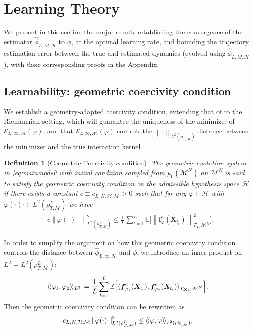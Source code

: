 \documentclass[11pt]{article}
\newtheorem{definition}{Definition}[section]
\newcommand{\mbf}[1]{\boldsymbol{#1}}
\newcommand{\inprod}[1]{\langle #1 \rangle}
\newcommand{\dbinprod}[1]{\langle\hspace{-0.5mm}\langle{#1}\rangle\hspace{-0.5mm}\rangle}
\newcommand{\norm}[1]{\left\| #1 \right\|}
\newcommand{\bX}{\mbf{X}}
\newcommand{\mE}{\mathcal{E}}
\newcommand{\mH}{\mathcal{H}}
\newcommand{\mM}{\mathcal{M}}
\newcommand{\intkernel}{\phi}
\newcommand{\lintkernel}{\widehat{\intkernel}}
\newcommand{\intkernelvar}{\varphi}
\newcommand{\E}{\mathbb{E}}
\newcommand{\probIC}{\mu_0}
\newcommand{\muX}{\probIC(\mM^N)}
\newcommand{\bXtl}{\bX_{t_l}}
\begin{document}
%
\section{Learning Theory} \label{sec:learningtheory}
%
We present in this section the major results establishing the convergence of the estimator $\lintkernel_{L, M, \mH}$ to $\intkernel$, at the optimal learning rate, and bounding the trajectory estimation error between the true and estimated dynamics  (evolved using $\lintkernel_{L, M, \mH}$), with their corresponding proofs in the Appendix.  

\subsection{Learnability: geometric coercivity condition}\label{sec:gcc}
%
We establish a geometry-adapted coercivity condition, extending that of \cite{bongini2016inferring,Lu2019a} to the Riemannian setting, which will guarantee the uniqueness of the minimizer of $\mE_{L, \infty, \mM}(\intkernelvar)$, and that $\mE_{L, \infty, \mM}(\intkernelvar)$ controls the $\norm{\cdot}_{L^2(\rho_{T,\mM})}$ distance between the minimizer and the true interaction kernel.
\begin{definition}[Geometric Coercivity condition]\label{CoercivityCondition}
The geometric evolution system in \eqref{eq:mainmodel} with initial condition sampled from $\muX$ on $\mM^N$ is said to satisfy the geometric coercivity condition on the admissible hypothesis space $\mH$ if there exists a constant $c \equiv c_{L, N, \mH, \mM} > 0$ such that for any $\intkernelvar \in \mH$ with $\intkernelvar(\cdot)\cdot \in L^2(\rho_{T, \mM}^L)$ we have
\begin{align}
  &c\norm{\intkernelvar(\cdot)\cdot}_{L^2(\rho_{T,\mM}^L)}^2 \leq \nonumber
  \frac{1}{L}\sum_{l = 1}^{L}\E\Big[\norm{\mbf{f}^{\text{c}}_{\intkernelvar}(\bXtl)}_{T_{\bXtl}\mM^N}^2\Big].\label{ccineq}
\end{align}
\end{definition}
\noindent
In order to simplify the argument on how this geometric coercivity condition controls the distance between $\lintkernel_{L, \infty, \mH}$ and $\intkernel$, we introduce an inner product on $L^2 = L^2(\rho_{T, \mM}^L)$:
\[
\dbinprod{\intkernelvar_1, \intkernelvar_2}_{L^2} \coloneqq \frac{1}{L}\sum_{l = 1}^{L}\E\Big[\inprod{\mbf{f}^{\text{c}}_{\intkernelvar_1}(\bXtl), \mbf{f}^{\text{c}}_{\intkernelvar_2}(\bXtl)}_{T_{\bXtl}\mM^N}\Big].
\]
Then the geometric coercivity condition can be rewritten as
\[
  c_{L,N, \mH, \mM}\norm{\intkernelvar(\cdot)\cdot}_{L^2(\rho_{T,\mM}^L)}^2 \leq \dbinprod{\intkernelvar, \intkernelvar}_{L^2(\rho_{T, \mM}^L)},
\]
\end{document}
